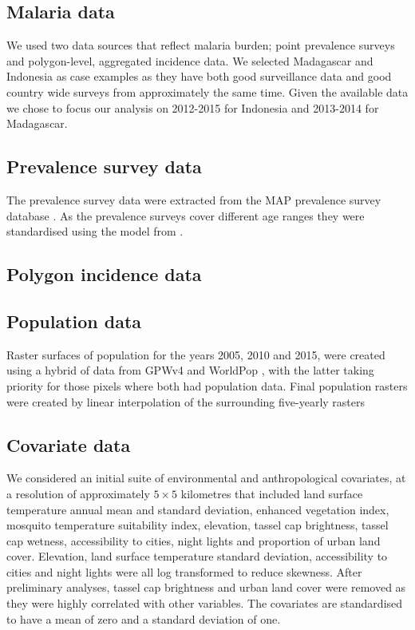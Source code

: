 \documentclass[10pt,letterpaper]{article}
\begin{document}
\subsection*{Malaria data}

We used two data sources that reflect malaria burden; point prevalence surveys and polygon-level, aggregated incidence data.
We selected Madagascar and Indonesia as case examples as they have both good surveillance data and good country wide surveys from approximately the same time.
Given the available data we chose to focus our analysis on 2012-2015 for Indonesia and 2013-2014 for Madagascar.

\subsection*{Prevalence survey data}

The prevalence survey data were extracted from the MAP prevalence survey database \cite{bhatt2015effect}.
As the prevalence surveys cover different age ranges they were standardised using the model from \cite{smith2007standardizing}.


\subsection*{Polygon incidence data}


\subsection*{Population data}

Raster surfaces of population for the years 2005, 2010 and 2015, were created using a hybrid of data from GPWv4 \cite{gpw4} and WorldPop \cite{tatem2017worldpop}, with the latter taking priority for those pixels where both had population data. 
Final population rasters were created by linear interpolation of the surrounding five-yearly rasters

\subsection*{Covariate data}

We considered an initial suite of environmental and anthropological covariates, at a resolution of approximately $5 \times 5$ kilometres that included land surface temperature annual mean and standard deviation, enhanced vegetation index, mosquito temperature suitability index, elevation, tassel cap brightness, tassel cap wetness, accessibility to cities, night lights and proportion of urban land cover.
Elevation, land surface temperature standard deviation, accessibility to cities and night lights were all log transformed to reduce skewness.
After preliminary analyses, tassel cap brightness and urban land cover were removed as they were highly correlated with other variables.
The covariates are standardised to have a mean of zero and a standard deviation of one.
\end{document}
